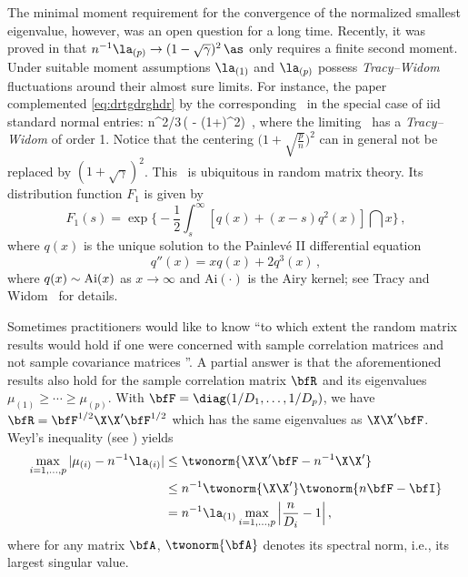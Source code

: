 The minimal moment requirement for the convergence of the normalized smallest eigenvalue, however, was an open question for a long time.
Recently, it was proved in \cite{tikhomirov:2015} that $n^{-1} \la_{(p)} \to (1-\sqrt{\gamma})^2\, \as$ only requires a finite second moment.
Under suitable moment assumptions $\la_{(1)}$ and $\la_{(p)}$ possess {\em Tracy--Widom} fluctuations around their almost sure limits. For instance, 
the paper \cite{johnstone:2001} complemented \eqref{eq:drtgdrghdr} by the corresponding \clt\ in the special case of iid standard normal 
entries:
\beam\label{eq:tcch4}
 n^{2/3}\,\Big( -
\big(1+\big)^2\Big)
\std \xi\,,
\eeam
where the limiting \rv\ has a {\em Tracy--Widom \ds} of order 1. Notice that the centering
$\big(1+\sqrt{\tfrac pn }\big)^2$ can in general not be replaced by $(1+\sqrt{\gamma})^2$.
This \ds\ is ubiquitous in random matrix theory.
Its distribution function $F_1$ is given by
\begin{equation*}
F_1(s) = \exp\Big\{
  -\frac{1}{2} \int_{s}^\infty [
    q(x) + (x - s) q^2(x)
 ] \dint x
\Big\}\,,
\end{equation*}
where $q(x)$ is the unique solution to the Painlev\'e II differential
equation
\begin{equation*}
  q''(x) = xq(x) + 2 q^3(x)\,,
\end{equation*}
where $ q(x)\sim {\rm Ai}(x)$ as $x \to \infty$ and Ai$(\cdot)$ is the Airy kernel; see Tracy and Widom~\cite{tracy:widom:2012} for details.
\par

Sometimes practitioners would like to know ``to which extent the random matrix results would hold if one were concerned with sample correlation matrices and not sample covariance matrices \cite{elkaroui:2009}''.
A partial answer is that the aforementioned results also hold for the sample correlation matrix $\bfR$ and its eigenvalues $\mu_{(1)}\ge\cdots \ge \mu_{(p)}$. 
With $\bfF= \diag (1/D_1,\ldots,1/D_p)$, we have $\bfR={\bfF}^{1/2} {\X}{\X}'{\bfF}^{1/2}$ which has the same eigenvalues as ${\X}{\X}'{\bfF}$. Weyl's inequality (see \cite{bhatia:1997}) yields
\begin{equation}\label{eq:lamu}
\begin{split}
\max_{i=1,\ldots,p} |\mu_{(i)}- n^{-1} \la_{(i)}| &\le \twonorm{{\X}{\X}'{\bfF}-n^{-1}{\X}{\X}' }\\
&\le n^{-1} \twonorm{{\X}{\X}'}  \twonorm{n \bfF- \bfI}\\
&= n^{-1} \la_{(1)} \max_{i=1,\ldots,p} \Big| \frac{n}{D_i} -1 \Big|\,,
\end{split}
\end{equation}
where for any matrix $\bfA$, $\twonorm{\bfA}$ denotes its spectral norm, i.e., its largest singular value.

